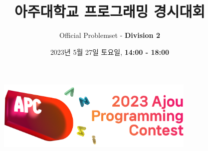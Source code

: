 


\pagestyle{fancy}
\fancyhf{}
\setlength{\headheight}{30pt}
\renewcommand{\headrulewidth}{0pt}

\fancyfoot[C]{\thepage \hspace{1pt} / \pageref{LastPage}}


\pagecolor{apc-gray}
\begin{figure}
    \centering
    \includegraphics[width=0.85\textwidth]{sponsor/apc-logo.png}
\end{figure}
\title{\color{white}\Huge{\ajouh \textbf{{} 아주대학교 프로그래밍 경시대회}}}
\author{\huge \color{white} Official Problemset - \textbf{Division 2}}
\date{\color{white}\LARGE 2023년 5월 27일 토요일, \textbf{14:00 - 18:00}}
\maketitle
